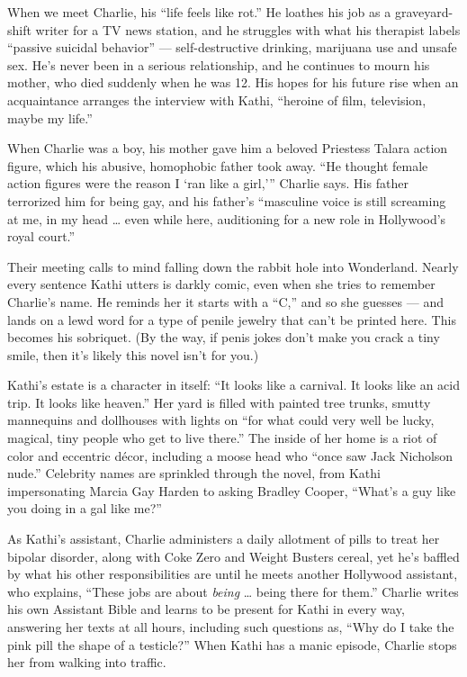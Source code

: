 When we meet Charlie, his ``life feels like rot.'' He loathes his job as
a graveyard-shift writer for a TV news station, and he struggles with
what his therapist labels ``passive suicidal behavior'' ---
self-destructive drinking, marijuana use and unsafe sex. He's never been
in a serious relationship, and he continues to mourn his mother, who
died suddenly when he was 12. His hopes for his future rise when an
acquaintance arranges the interview with Kathi, ``heroine of film,
television, maybe my life.''

When Charlie was a boy, his mother gave him a beloved Priestess Talara
action figure, which his abusive, homophobic father took away. ``He
thought female action figures were the reason I `ran like a girl,'''
Charlie says. His father terrorized him for being gay, and his father's
``masculine voice is still screaming at me, in my head \ldots{} even
while here, auditioning for a new role in Hollywood's royal court.''

Their meeting calls to mind falling down the rabbit hole into
Wonderland. Nearly every sentence Kathi utters is darkly comic, even
when she tries to remember Charlie's name. He reminds her it starts with
a ``C,'' and so she guesses --- and lands on a lewd word for a type of
penile jewelry that can't be printed here. This becomes his sobriquet.
(By the way, if penis jokes don't make you crack a tiny smile, then it's
likely this novel isn't for you.)

Kathi's estate is a character in itself: ``It looks like a carnival. It
looks like an acid trip. It looks like heaven.'' Her yard is filled with
painted tree trunks, smutty mannequins and dollhouses with lights on
``for what could very well be lucky, magical, tiny people who get to
live there.'' The inside of her home is a riot of color and eccentric
décor, including a moose head who ``once saw Jack Nicholson nude.''
Celebrity names are sprinkled through the novel, from Kathi
impersonating Marcia Gay Harden to asking Bradley Cooper, ``What's a guy
like you doing in a gal like me?''

As Kathi's assistant, Charlie administers a daily allotment of pills to
treat her bipolar disorder, along with Coke Zero and Weight Busters
cereal, yet he's baffled by what his other responsibilities are until he
meets another Hollywood assistant, who explains, ``These jobs are about
\emph{being} \ldots{} being there for them.'' Charlie writes his own
Assistant Bible and learns to be present for Kathi in every way,
answering her texts at all hours, including such questions as, ``Why do
I take the pink pill the shape of a testicle?'' When Kathi has a manic
episode, Charlie stops her from walking into traffic.

